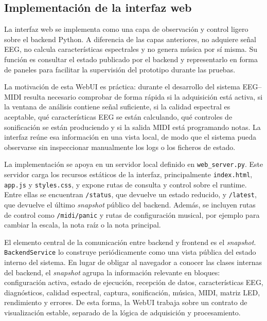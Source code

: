 \documentclass[../main.tex]{subfiles}
\begin{document}
\subsection{Implementación de la interfaz web}

La interfaz web se implementa como una capa de observación y control ligero sobre el backend Python. A diferencia de las capas anteriores, no adquiere señal EEG, no calcula características espectrales y no genera música por sí misma. Su función es consultar el estado publicado por el backend y representarlo en forma de paneles para facilitar la supervisión del prototipo durante las pruebas.

La motivación de esta WebUI es práctica: durante el desarrollo del sistema EEG--MIDI resulta necesario comprobar de forma rápida si la adquisición está activa, si la ventana de análisis contiene señal suficiente, si la calidad espectral es aceptable, qué características EEG se están calculando, qué controles de sonificación se están produciendo y si la salida MIDI está programando notas. La interfaz reúne esa información en una vista local, de modo que el sistema pueda observarse sin inspeccionar manualmente los logs o los ficheros de estado.

La implementación se apoya en un servidor local definido en \texttt{web\_server.py}. Este servidor carga los recursos estáticos de la interfaz, principalmente \texttt{index.html}, \texttt{app.js} y \texttt{styles.css}, y expone rutas de consulta y control sobre el runtime. Entre ellas se encuentran \texttt{/status}, que devuelve un estado reducido, y \texttt{/latest}, que devuelve el último \textit{snapshot} público del backend. Además, se incluyen rutas de control como \texttt{/midi/panic} y rutas de configuración musical, por ejemplo para cambiar la escala, la nota raíz o la nota principal.

El elemento central de la comunicación entre backend y frontend es el \textit{snapshot}. \texttt{BackendService} lo construye periódicamente como una vista pública del estado interno del sistema. En lugar de obligar al navegador a conocer las clases internas del backend, el \textit{snapshot} agrupa la información relevante en bloques: configuración activa, estado de ejecución, recepción de datos, características EEG, diagnósticos, calidad espectral, captura, sonificación, música, MIDI, matriz LED, rendimiento y errores. De esta forma, la WebUI trabaja sobre un contrato de visualización estable, separado de la lógica de adquisición y procesamiento.
\end{document}
